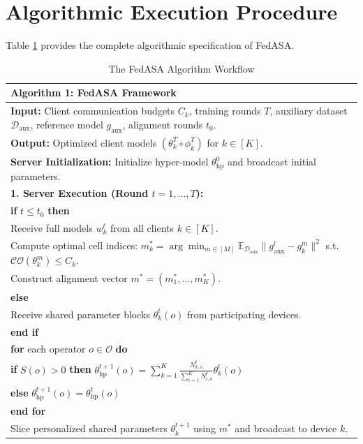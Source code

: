 \documentclass[12pt,a4paper]{report}
\begin{document}
\section{Algorithmic Execution Procedure}
Table \ref{tab:algorithm_fedasa} provides the complete algorithmic specification of FedASA.

\begin{table}[htbp]
\centering
\caption{The FedASA Algorithm Workflow}
\label{tab:algorithm_fedasa}
\vspace{0.2cm}
\begin{tabular}{|p{14.0cm}|}
\hline
\textbf{Algorithm 1: FedASA Framework} \\
\hline
\textbf{Input:} Client communication budgets $C_k$, training rounds $T$, auxiliary dataset $\mathcal{D}_{\text{aux}}$, reference model $g_{\text{aux}}$, alignment rounds $t_0$. \\
\textbf{Output:} Optimized client models $(\theta_k^T \circ \phi_k^T)$ for $k \in [K]$. \\
\textbf{Server Initialization:} Initialize hyper-model $\theta_{\text{hp}}^0$ and broadcast initial parameters. \\
\textbf{1. Server Execution (Round $t = 1, \dots, T$):} \\
\quad \textbf{if} $t \le t_0$ \textbf{then} \\
\quad \quad Receive full models $w_k^t$ from all clients $k \in [K]$. \\
\quad \quad Compute optimal cell indices: $m_k^* = \arg\min_{m \in [M]} \mathbb{E}_{\mathcal{D}_{\text{aux}}} \|g_{\text{aux}}^l - g_k^m\|^2$ s.t. $\mathcal{CO}(\theta_k^m) \le C_k$. \\
\quad \quad Construct alignment vector $m^* = (m_1^*, \dots, m_K^*)$. \\
\quad \textbf{else} \\
\quad \quad Receive shared parameter blocks $\theta_k^t(o)$ from participating devices. \\
\quad \textbf{end if} \\
\quad \textbf{for} each operator $o \in \mathcal{O}$ \textbf{do} \\
\quad \quad \textbf{if} $S(o) > 0$ \textbf{then} $\theta_{\text{hp}}^{t+1}(o) = \sum_{k=1}^K \frac{N_{k,o}^t}{\sum_{i=1}^K N_{i,o}^t} \theta_k^t(o)$ \\
\quad \quad \textbf{else} $\theta_{\text{hp}}^{t+1}(o) = \theta_{\text{hp}}^t(o)$ \\
\quad \textbf{end for} \\
\quad Slice personalized shared parameters $\theta_k^{t+1}$ using $m^*$ and broadcast to device $k$. \\

\end{tabular}
\end{table}
\end{document}
